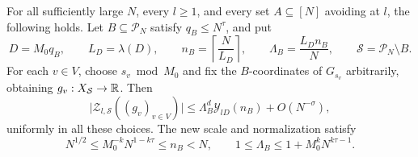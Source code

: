 \begin{proposition}\label{prop:shorter-scale}
For all sufficiently large $N$, every $l\ge1$, and every set $A\subseteq[N]$
avoiding at $l$, the following holds.  Let $B\subseteq\mathcal P_N$ satisfy
$q_B\le N^\tau$, and put
\[
 D=M_0q_B,\qquad L_D=\lambda(D),\qquad
 n_B=\left\lceil\frac{N}{L_D}\right\rceil,\qquad
 \Lambda_B=\frac{L_Dn_B}{N},\qquad
 \mathcal S=\mathcal P_N\setminus B.
\]
For each $v\in V$, choose $s_v\bmod M_0$ and fix the $B$-coordinates of
$G_{s_v}$ arbitrarily, obtaining $g_v:X_{\mathcal S}\to\mathbb R$.  Then
\begin{equation}\label{eq:shorter-scale}
 \bigl|\mathcal Z_{l,\mathcal S}((g_v)_{v\in V})\bigr|
 \le\Lambda_B^d\mathcal Y_{lD}(n_B)+O(N^{-\sigma}),
\end{equation}
uniformly in all these choices.  The new scale and normalization satisfy
\begin{equation}\label{eq:shorter-scale-size}
 N^{1/2}\le M_0^{-k}N^{1-k\tau}\le n_B<N,
 \qquad 1\le\Lambda_B\le1+M_0^kN^{k\tau-1}.
\end{equation}
\end{proposition}

